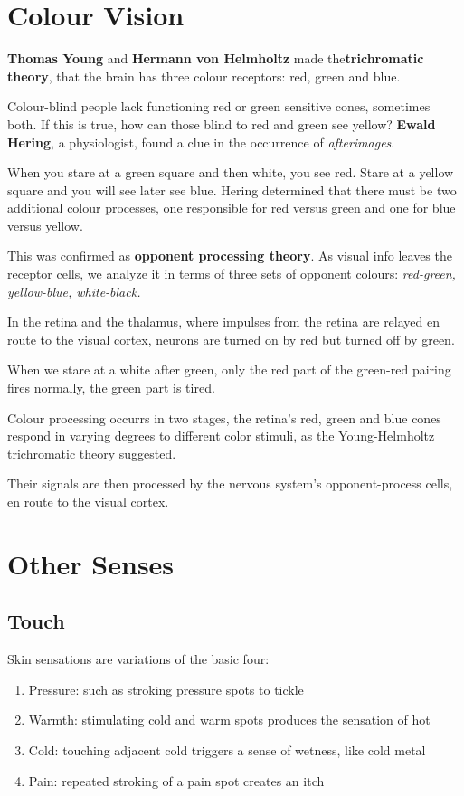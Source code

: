 \documentclass[12pt]{article}
\begin{document}
\section*{Colour Vision}
{\bf Thomas Young} and {\bf Hermann von Helmholtz} made the\textbf{trichromatic theory}, that the brain has three colour receptors: red, green and blue.

Colour-blind people lack functioning red or green sensitive cones, sometimes both. If this is true, how can those blind to red and green see yellow? {\bf Ewald Hering}, a physiologist, found a clue in the occurrence of \textit{afterimages}.

When you stare at a green square and then white, you see red. Stare at a yellow square and you will see later see blue. Hering determined that there must be two additional colour processes, one responsible for red versus green and one for blue versus yellow.

This was confirmed as \textbf{opponent processing theory}. As visual info leaves the receptor cells, we analyze it in terms of three sets of opponent colours: \textit{red-green, yellow-blue, white-black.}

In the retina and the thalamus, where impulses from the retina are relayed en route to the visual cortex, neurons are turned on by red but turned off by green.

When we stare at a white after green, only the red part of the green-red pairing fires normally, the green part is tired.

Colour processing occurrs in two stages, the retina's red, green and blue cones respond in varying degrees to different color stimuli, as the Young-Helmholtz trichromatic theory suggested.

Their signals are then processed by the nervous system's opponent-process cells, en route to the visual cortex.

\section*{Other Senses}
\subsection*{Touch}
Skin sensations are variations of the basic four:
\begin{enumerate}
\item Pressure: such as stroking pressure spots to tickle
\item Warmth: stimulating cold and warm spots produces the sensation of hot
\item Cold: touching adjacent cold triggers a sense of wetness, like cold metal
\item Pain: repeated stroking of a pain spot creates an itch
\end{enumerate}
\end{document}
